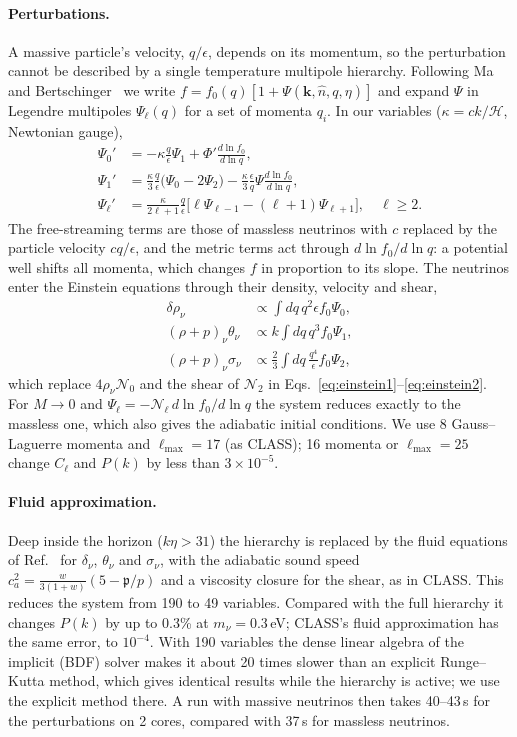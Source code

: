 \paragraph*{Perturbations.} A massive particle's velocity, $q/\epsilon$, depends on its momentum, so the perturbation
cannot be described by a single temperature multipole hierarchy. Following Ma and Bertschinger~\cite{Ma1995} we write
$f=f_0(q)[1+\Psi(\bm k,\hat n,q,\eta)]$ and expand $\Psi$ in Legendre multipoles $\Psi_\ell(q)$ for a set of momenta
$q_i$. In our variables ($\kappa=ck/\mathcal H$, Newtonian gauge),
\begin{align}
\Psi_0' &= -\kappa\frac{q}{\epsilon}\Psi_1+\Phi'\frac{d\ln f_0}{d\ln q},\\
\Psi_1' &= \frac{\kappa}{3}\frac{q}{\epsilon}\big(\Psi_0-2\Psi_2\big)-\frac{\kappa}{3}\frac{\epsilon}{q}\Psi\frac{d\ln f_0}{d\ln q},\\
\Psi_\ell' &= \frac{\kappa}{2\ell+1}\frac{q}{\epsilon}\big[\ell\Psi_{\ell-1}-(\ell+1)\Psi_{\ell+1}\big],\quad \ell\ge2 .
\end{align}
The free-streaming terms are those of massless neutrinos with $c$ replaced by the particle velocity $cq/\epsilon$,
and the metric terms act through $d\ln f_0/d\ln q$: a potential well shifts all momenta, which changes $f$ in
proportion to its slope. The neutrinos enter the Einstein equations through their density, velocity and shear,
\begin{align}
\delta\rho_\nu&\propto\int dq\,q^2\epsilon f_0\Psi_0,\nonumber\\
(\rho+p)_\nu\theta_\nu&\propto k\int dq\,q^3f_0\Psi_1,\nonumber\\
(\rho+p)_\nu\sigma_\nu&\propto\frac23\int dq\,\frac{q^4}{\epsilon}f_0\Psi_2,
\end{align}
which replace $4\rho_\nu\mathcal N_0$ and the shear of $\mathcal N_2$ in Eqs.~\eqref{eq:einstein1}--\eqref{eq:einstein2}. For
$M\to0$ and $\Psi_\ell=-\mathcal N_\ell\,d\ln f_0/d\ln q$ the system reduces exactly to the massless one, which also
gives the adiabatic initial conditions. We use 8 Gauss--Laguerre momenta and $\ell_{\max}=17$ (as CLASS); 16 momenta
or $\ell_{\max}=25$ change $C_\ell$ and $P(k)$ by less than $3\times10^{-5}$.

\paragraph*{Fluid approximation.} Deep inside the horizon ($k\eta>31$) the hierarchy is replaced by the fluid
equations of Ref.~\cite{LesgourguesTram2011} for $\delta_\nu$, $\theta_\nu$ and $\sigma_\nu$, with the adiabatic sound
speed $c_a^2=\frac{w}{3(1+w)}(5-\mathfrak p/p)$ and a viscosity closure for the shear, as in CLASS. This reduces the
system from 190 to 49 variables. Compared with the full hierarchy it changes $P(k)$ by up to 0.3\% at
$m_\nu=0.3$\,eV; CLASS's fluid approximation has the same error, to $10^{-4}$. With 190 variables the
dense linear algebra of the implicit (BDF) solver makes it about 20 times slower than an explicit Runge--Kutta
method, which gives identical results while the hierarchy is active; we use the explicit method there. A run with
massive neutrinos then takes 40--43\,s for the perturbations on 2 cores, compared with 37\,s for massless neutrinos.

